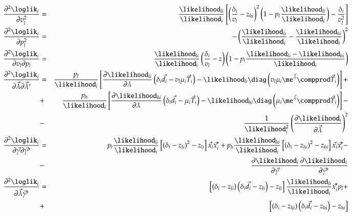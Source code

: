 \documentclass[a4paper]{article}
\numberwithin{equation}{subsection}
\begin{document}
\begin{eqnarray}
\frac{\partial^2 \loglik_i}{\partial v_l^2} &=&
\frac{\likelihood_{li}}{\likelihood_i} \left[
  \left( \frac{\delta_i}{v_l} - z_{hi} \right)^2
  \left( 1 - p_l \frac{\likelihood_{li}}{\likelihood_i} \right)
  - \frac{\delta_i}{v_l^2} \right]\\
\frac{\partial^2 \loglik_i}{\partial p_l^2} &=&
- \left( \frac{\likelihood_{li}}{\likelihood_i} - \frac{\likelihood_{hi}}{\likelihood_i} \right)^2\\
\frac{\partial^2 \loglik_i}{\partial v_l \partial p_l} &=&
\frac{\likelihood_{li}}{\likelihood_i}
  \left( \frac{\delta_i}{v_l} - z \right)
  \left( 1 - p_l \frac{\likelihood_{li} - \likelihood_{hi}}{\likelihood_i} \right)\\
\frac{\partial^2 \loglik_i}{\partial\vec{\lambda} \partial\vec{\lambda}'} &=&
\frac{p_l}{\likelihood_i} \left[
  \frac{\partial \likelihood_{li}}{\partial \lambda}
  \left( \delta_i \vec{d}_i - v_l \mu_i \vec{T}_i \right) -
  \likelihood_{li} \diag
    \left( v_l \mu_i \me^{\vec{\lambda}} \compprod \vec{T}_i \right)
  \right] +\notag\\
&+&
\frac{p_h}{\likelihood_i} \left[
  \frac{\partial \likelihood_{hi}}{\partial \lambda}
  \left( \delta_i \vec{d}_i - \mu_i \vec{T}_i \right) -
  \likelihood_{hi} \diag
    \left( \mu_i \me^{\vec{\lambda}} \compprod \vec{T}_i \right)
  \right] -\notag\\
&-&
\frac{1}{\likelihood_i^2} 
  \left( \frac{\partial \likelihood_i}{\partial \vec\lambda} \right)^2\\
\frac{\partial^2 \loglik_i}{\partial \vec{\gamma} \partial \vec{\gamma}'} &=&
p_l \frac{\likelihood_{li}}{\likelihood_i}
  \left[ \left( \delta_i - z_{li} \right)^2 - z_{li} \right]
  \vec{x}_i \vec{x}_i' +
p_h \frac{\likelihood_{hi}}{\likelihood_i}
  \left[ \left( \delta_i - z_{hi} \right)^2 - z_{hi} \right] 
  \vec{x}_i \vec{x}_i' - \notag\\
&-&
\frac{\partial \likelihood_i}{\partial \vec{\gamma}}
  \frac{\partial \likelihood_i}{\partial \vec{\gamma}'}\\
\frac{\partial^2 \loglik_i}{\partial \vec{\lambda} \vec{\gamma}'} &=&
\left[ \left( \delta_i - z_{li} \right)
  \left( \delta_i \vec{d}_i - z_{li} \right) - z_{li} \right]
  \frac{\likelihood_{li}}{\likelihood_i} \vec{x}_i' p_l +
\notag\\
&+&
\left[ \left( \delta_i - z_{hi} \right)
  \left( \delta_i \vec{d}_i - z_{hi} \right) - z_{hi} \right]

\end{eqnarray}
\end{document}
